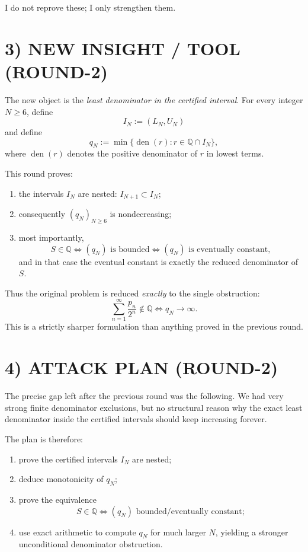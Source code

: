 I do not reprove these; I only strengthen them.

\section*{3) NEW INSIGHT / TOOL (ROUND-2)}

The new object is the \emph{least denominator in the certified interval}. For every integer \(N\ge 6\), define
\[
I_N:=(L_N,U_N)
\]
and define
\[
q_N:=\min\{\operatorname{den}(r): r\in\mathbb Q\cap I_N\},
\]
where \(\operatorname{den}(r)\) denotes the positive denominator of \(r\) in lowest terms.

This round proves:
\begin{enumerate}
\item the intervals \(I_N\) are nested: \(I_{N+1}\subset I_N\);
\item consequently \((q_N)_{N\ge 6}\) is nondecreasing;
\item most importantly,
\[
S\in\mathbb Q
\iff
(q_N)\text{ is bounded}
\iff
(q_N)\text{ is eventually constant},
\]
and in that case the eventual constant is exactly the reduced denominator of \(S\).
\end{enumerate}

Thus the original problem is reduced \emph{exactly} to the single obstruction:
\[
\sum_{n=1}^{\infty}\frac{p_n}{2^n}\notin\mathbb Q
\iff
q_N\to\infty.
\]
This is a strictly sharper formulation than anything proved in the previous round.

\section*{4) ATTACK PLAN (ROUND-2)}

The precise gap left after the previous round was the following. We had very strong finite denominator exclusions, but no structural reason why the exact least denominator inside the certified intervals should keep increasing forever.

The plan is therefore:
\begin{enumerate}
\item prove the certified intervals \(I_N\) are nested;
\item deduce monotonicity of \(q_N\);
\item prove the equivalence
\[
S\in\mathbb Q \iff (q_N)\text{ bounded/eventually constant};
\]
\item use exact arithmetic to compute \(q_N\) for much larger \(N\), yielding a stronger unconditional denominator obstruction.
\end{enumerate}

